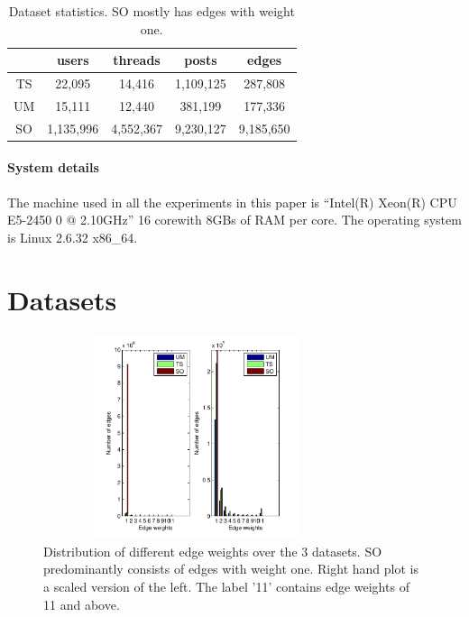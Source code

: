 \documentclass{sig-alternate}
\begin{document}
\begin{table}
\begin{center}
\begin{tabular}{c|c|c|c|c|}
 & users & threads & posts & edges\\\hline
 TS & 22,095 & 14,416 & 1,109,125 & 287,808\\\hline
 UM & 15,111 & 12,440 & 381,199 & 177,336\\\hline
 SO & 1,135,996 & 4,552,367 & 9,230,127 & 9,185,650\\\hline
\end{tabular}
\label{tab:dataStats}
\end{center}
\caption{Dataset statistics. SO mostly has edges with weight one.}
\end{table}

\paragraph{System details} The machine used in all the experiments in this paper
is ``Intel(R) Xeon(R) CPU E5-2450 0 @ 2.10GHz'' 16 corewith 8GBs of
RAM per core. The operating system is Linux 2.6.32 x86\_64. 

\section{Datasets}
\label{sec:dataset}

\begin{figure}
\begin{center}
\includegraphics[height=6cm,width=9cm]{EdgeDistribution.pdf}
\end{center}
\caption{Distribution of different edge weights over the 3 datasets. SO 
predominantly consists of edges with weight one. Right hand plot is a scaled
version of the left. The label '11' contains edge weights of 11 and above.}
\label{fig:EdgeDistribution}
\end{figure}
\end{document}
